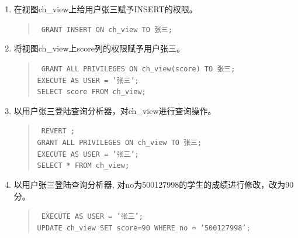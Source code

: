 \documentclass[a4paper,twoside]{article}
\begin{document}
\begin{spacing}{1.2}
\begin{enumerate}
\item	在视图ch\_view上给用户张三赋予INSERT的权限。
\begin{quote}
  \texttt{
    GRANT INSERT ON ch\_view TO 张三;\\
  }
\end{quote}
\item	将视图ch\_view上score列的权限赋予用户张三。
\begin{quote}
  \texttt{
    GRANT ALL PRIVILEGES ON ch\_view(score) TO 张三;\\
EXECUTE AS USER = '张三';\\
SELECT score FROM ch\_view;\\
  }
\end{quote}
\item	以用户张三登陆查询分析器，对ch\_view进行查询操作。
\begin{quote}
  \texttt{
    REVERT ;\\
GRANT ALL PRIVILEGES ON ch\_view TO 张三;\\
EXECUTE AS USER = '张三';\\
SELECT * FROM ch\_view;\\
  }
\end{quote}
\item	以用户张三登陆查询分析器, 对no为500127998的学生的成绩进行修改，改为90分。
\begin{quote}
  \texttt{
    EXECUTE AS USER = '张三';\\
UPDATE ch\_view SET  score=90
WHERE no = '500127998';\\
  }
\end{quote}
\begin{figure}[htb]
  \centering
  \begin{subfigure}{0.4\textwidth}
    \centering

\end{subfigure}
\end{figure}
\end{enumerate}
\end{spacing}
\end{document}
